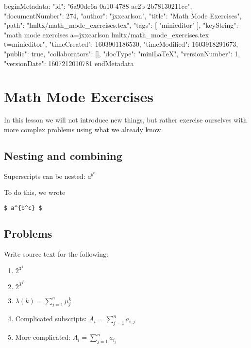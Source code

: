 beginMetadata:
{
    "id": "6a90de6a-0a10-4788-ae2b-2b78130211cc",
    "documentNumber": 274,
    "author": "jxxcarlson",
    "title": "Math Mode Exercises",
    "path": "lmltx/math_mode_exercises.tex",
    "tags": [
        "minieditor"
    ],
    "keyString": "math mode exercises a=jxxcarlson lmltx/math_mode_exercises.tex t=minieditor",
    "timeCreated": 1603901186530,
    "timeModified": 1603918291673,
    "public": true,
    "collaborators": [],
    "docType": "miniLaTeX",
    "versionNumber": 1,
    "versionDate": 1607212010781
}
endMetadata

\setcounter{section}{3}

\section{Math Mode Exercises}

\innertableofcontents


In this lesson we will not introduce new things, but rather exercise ourselves with more complex problems using what we already know.


\subsection{Nesting and combining}

Superscripts can be nested: $a^{b^c}$

To do this, we wrote 

\begin{verbatim}
$ a^{b^c} $
\end{verbatim}

\subsection*{Problems}

Write source text for the following:

\begin{enumerate}

\item $2^{3^4}$

\item $2^{3^{4^5}}$

\item $\lambda(k) = \sum_{j=1}^n \mu_j^k$

\item Complicated subscripts: $ A_i = \sum_{j=1}^n a_{i,j}  $

\item More complicated: $ A_i = \sum_{j=1}^n a_{i_j}  $

\end{enumerate}

